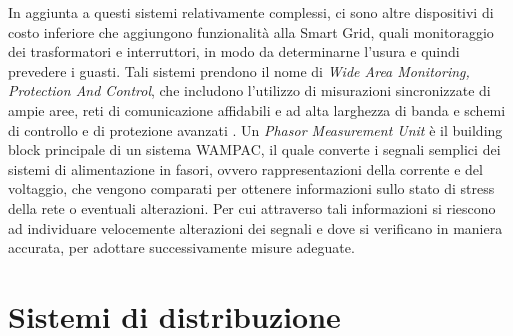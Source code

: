 In aggiunta a questi sistemi relativamente complessi, ci sono altre dispositivi di costo inferiore che aggiungono funzionalità alla Smart Grid, quali monitoraggio dei trasformatori e interruttori, in modo da determinarne l'usura e quindi prevedere i guasti. Tali sistemi prendono il nome di \emph{Wide Area Monitoring, Protection And Control}, che includono l'utilizzo di misurazioni sincronizzate di ampie aree, reti di comunicazione affidabili e ad alta larghezza di banda e schemi di controllo e di protezione avanzati \cite{tras3}.  Un \emph{Phasor Measurement Unit} è il building block principale di un sistema WAMPAC, il quale converte i segnali semplici dei sistemi di alimentazione in fasori, ovvero rappresentazioni della corrente e del voltaggio, che vengono comparati per ottenere informazioni sullo stato di stress della rete o eventuali alterazioni. Per cui attraverso tali informazioni si riescono ad individuare velocemente alterazioni dei segnali e dove si verificano in maniera accurata, per adottare successivamente misure adeguate.

\section{Sistemi di distribuzione}%


